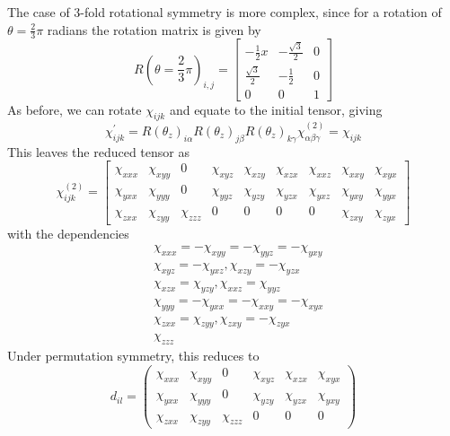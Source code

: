 The case of 3-fold rotational symmetry is more complex, since for a rotation of $\theta=\frac{2}{3}\pi$ radians the rotation matrix is given by
\begin{equation}\label{eq:2pi/3RotationMatrix}
	R(\theta=\frac{2}{3}\pi)_{i,j} =
	\begin{bmatrix}
		-\frac{1}{2}x & -\frac{\sqrt{3}}{2} & 0\\ 
		\frac{\sqrt{3}}{2} & -\frac{1}{2} & 0\\ 
		0 & 0 & 1
	\end{bmatrix}
\end{equation}
As before, we can rotate $\chi_{ijk}$ and equate to the initial tensor, giving
\begin{equation}\label{eq:RotateChi3fold}
	\chi^{\prime}_{ijk} =  
	R(\theta_{z})_{i\alpha} 
	R(\theta_{z})_{j\beta}
	R(\theta_{z})_{k\gamma}
	\chi^{(2)}_{\alpha \beta \gamma} =
	\chi_{ijk}
\end{equation}
This leaves the reduced tensor as
\begin{equation}\label{eq:3foldChi}
	\chi^{(2)}_{ijk} =
	\begin{bmatrix}
		\chi_{xxx} & \chi_{xyy} & 0 & \chi_{xyz} & \chi_{xzy} & \chi_{xzx} & \chi_{xxz} & \chi_{xxy} & \chi_{xyx}\\ 
		\chi_{yxx} & \chi_{yyy} & 0 & \chi_{yyz} & \chi_{yzy} & \chi_{yzx} & \chi_{yxz} & \chi_{yxy} & \chi_{yyx}\\ 
		\chi_{zxx} & \chi_{zyy} & \chi_{zzz} & 0 & 0 & 0 & 0 & \chi_{zxy} & \chi_{zyx}
	\end{bmatrix}
\end{equation}
with the dependencies 
\begin{equation}\label{eq:3foldDependancies}
\begin{split}
	&\chi_{xxx} = -\chi_{xyy} = -\chi_{yyz} = -\chi_{yxy}\\
	&\chi_{xyz} = -\chi_{yxz}, \chi_{xzy} = -\chi_{yzx}\\
	&\chi_{xzx} = \chi_{yzy}, \chi_{xxz} = \chi_{yyz}\\
	&\chi_{yyy} = -\chi_{yxx} = -\chi_{xxy} = -\chi_{xyx}\\
	&\chi_{zxx} = \chi_{zyy}, \chi_{zxy} = -\chi_{zyx}\\
	&\chi_{zzz}
\end{split}
\end{equation}
Under permutation symmetry, this reduces to
\begin{equation}\label{eq:Reduced3fold}
	d_{il} = 
	\begin{pmatrix}
		\chi_{xxx} & \chi_{xyy} & 0 & \chi_{xyz} & \chi_{xzx} & \chi_{xyx}\\ 
		\chi_{yxx} & \chi_{yyy} & 0 & \chi_{yzy} & \chi_{yzx} & \chi_{yxy}\\ 
		\chi_{zxx} & \chi_{zyy} & \chi_{zzz} & 0 & 0 & 0
	\end{pmatrix}
\end{equation}